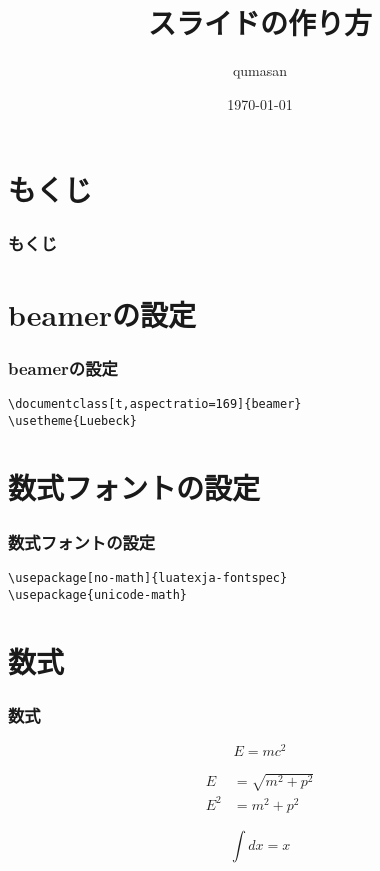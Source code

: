 \documentclass[t,aspectratio=169]{beamer}
\title{スライドの作り方}
\author{qumasan}
\institute{KumaROOT}
\date{\today}
\begin{document}
\begin{frame}
\titlepage
\end{frame}

\section*{もくじ}
\begin{frame}
    \frametitle{もくじ}
    \tableofcontents
\end{frame}

\section{beamerの設定}
\begin{frame}[fragile]
    \frametitle{beamerの設定}
    \begin{verbatim}
\documentclass[t,aspectratio=169]{beamer}
\usetheme{Luebeck}
    \end{verbatim}
\end{frame}

\section{数式フォントの設定}
\begin{frame}[fragile]
    \frametitle{数式フォントの設定}
    \begin{verbatim}
\usepackage[no-math]{luatexja-fontspec}
\usepackage{unicode-math}
    \end{verbatim}
\end{frame}

\section{数式}
\begin{frame}
    \frametitle{数式}
    \begin{equation}
        E = mc^{2}
    \end{equation}

    \begin{align}
        E &= \sqrt{m^{2} + p^{2}}\\
        E^{2} &= m^{2} + p^{2}
    \end{align}

    \begin{equation}
    ∫dx = x
    \end{equation}

\end{frame}
\end{document}
